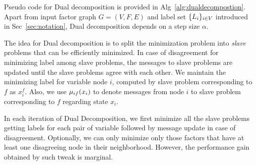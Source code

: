 \documentclass[letterpaper, 10 pt, conference]{ieeeconf} %
\begin{document}
Pseudo code for Dual decomposition is provided in
Alg~\ref{alg:dualdecompostion}. Apart from input factor graph $G = (V, F, E)$
and label set $\{L_i\}_{i \in V}$ introduced in Sec~\ref{sec:notation}, Dual
decomposition depends on a step size $\alpha$.

The idea for Dual decomposition is to split the minimization problem into
\emph{slave} problems that can be efficiently minimized. In case of
disagreement for minimizing label among slave problems, the messages to slave
problems are updated until the slave problems agree with each other. We
maintain the minimizing label for variable node $i$, computed by slave problem
corresponding to $f$ as $x^f_i$. Also, we use $\mu_{if}(x_i)$ to denote
messages from node $i$ to slave problem corresponding to $f$ regarding state
$x_i$.

In each iteration of Dual Decomposition, we first minimize all the slave
problems getting labels for each pair of variable followed by message update in
case of disagreement. Optionally, we can only minimize only those factors that
have at least one disagreeing node in their neighborhood. However, the
performance gain obtained by such tweak is marginal.
\end{document}
